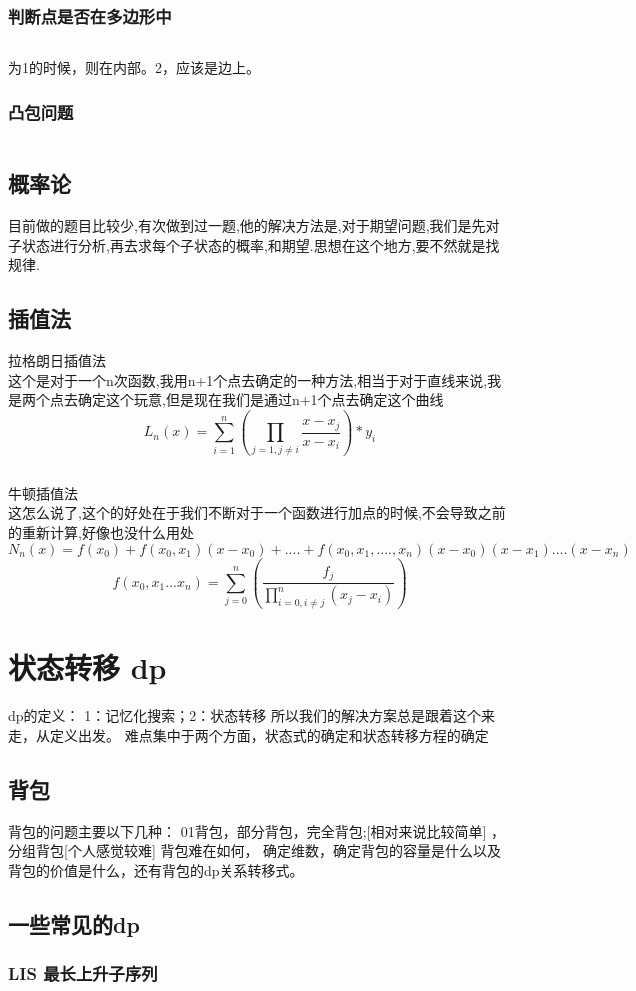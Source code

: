 \documentclass[a4paper,13.6pt]{article}
\begin{document}
\begin{CJK}{UTF8}{gbsn}
\subsubsection{判断点是否在多边形中}
\inputminted{c++}{../scoure/math/jihe.cpp}
为1的时候，则在内部。2，应该是边上。
\subsubsection{凸包问题}
\inputminted{c++}{../scoure/math/tubao.cpp}
\subsection{概率论}
目前做的题目比较少,有次做到过一题,他的解决方法是,对于期望问题,我们是先对子状态进行分析,再去求每个子状态的概率,和期望.思想在这个地方,要不然就是找规律.
\subsection{插值法}
拉格朗日插值法\\
这个是对于一个n次函数,我用n+1个点去确定的一种方法,相当于对于直线来说,我是两个点去确定这个玩意,但是现在我们是通过n+1个点去确定这个曲线
$$ L_n(x) = \sum_{i = 1}^n(\prod_{j=1,j \neq i}\frac{x-x_j}{x-x_i})*y_i$$
\inputminted{c++}{../scoure/math/lang.cpp}
牛顿插值法\\
这怎么说了,这个的好处在于我们不断对于一个函数进行加点的时候,不会导致之前的重新计算,好像也没什么用处
$$N_n(x) = f(x_0) + f(x_0,x_1)(x-x_0)+  .... +f(x_0,x_1,....,x_n)(x-x_0)(x-x_1)....(x - x_n)$$
$$ f(x_0,x_1...x_n) = \sum_{j = 0}^n(\frac{f_j}{\prod_{i =0,i \neq j}^n(x_j-x_i)} )$$
\section{状态转移 dp}
dp的定义：
1：记忆化搜索；2：状态转移
所以我们的解决方案总是跟着这个来走，从定义出发。
难点集中于两个方面，状态式的确定和状态转移方程的确定
\subsection{背包}
背包的问题主要以下几种：
01背包，部分背包，完全背包;[相对来说比较简单] ，分组背包[个人感觉较难]
背包难在如何， 确定维数，确定背包的容量是什么以及背包的价值是什么，还有背包的dp关系转移式。
\subsection{一些常见的dp}
\subsubsection{LIS 最长上升子序列}
\inputminted{c++}{../scoure/dp/longerxuelie.cpp}

\end{CJK}
\end{document}
